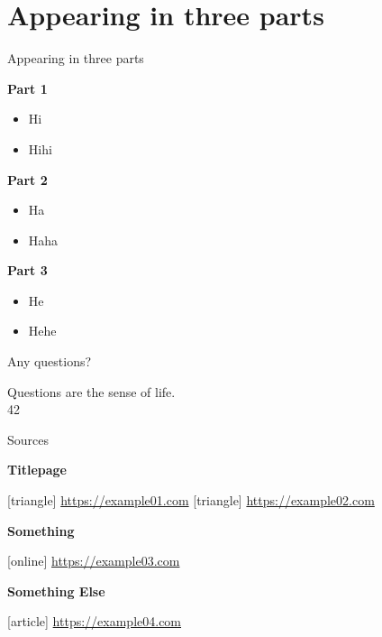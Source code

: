 \documentclass[ucs,10pt]{beamer}
\begin{document}
\section{Appearing in three parts}
\begin{frame}{Appearing in three parts}

	\pause \textbf{Part 1}
	\begin{itemize}
		\item Hi
		\item Hihi
	\end{itemize}
	
	\pause \vspace{0.3cm}
	\textbf{Part 2}
	\begin{itemize}
		\item Ha
		\item Haha
	\end{itemize}

	\pause \vspace{0.3cm}
	\textbf{Part 3}
	\begin{itemize}
		\item He
		\item Hehe
	\end{itemize}

\end{frame}
\begin{frame}{Any questions?}

	\begin{center}
		Questions are the sense of life.\\
		42
	\end{center}

\end{frame}
\begin{frame}{Sources}
 
	\textbf{Titlepage}
	\begin{thebibliography}{10}
		[triangle]
		 \url{https://example01.com}
		[triangle]
		 \url{https://example02.com}				
	\end{thebibliography}

	\vspace{0.3cm}
	\textbf{Something}
	\begin{thebibliography}{10}
		[online]
		\url{https://example03.com}
	\end{thebibliography}

	\vspace{0.3cm}
	\textbf{Something Else}
	\begin{thebibliography}{10}
		[article]
		 \url{https://example04.com}
	\end{thebibliography}


\end{frame}
\end{document}
